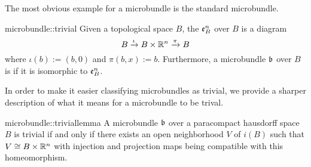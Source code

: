 \begin{myparagraph}
    The most obvious example for a microbundle is the standard microbundle.
\end{myparagraph}

\begin{myexample}{microbundle::trivial}
    Given a topological space $B$, the  $\mathfrak{e}^{n}_B$ over $B$ is a diagram
    \[ B \xrightarrow{\iota} B \times \mathbb{R}^n \xrightarrow{\pi} B{} \]
    where $\iota(b) := (b, 0)$ and $\pi(b, x) := b$.
    Furthermore, a microbundle $\mathfrak{b}$ over $B$ is  if it is isomorphic to $\mathfrak{e}^{n}_B$.
\end{myexample}

\begin{myparagraph}
    In order to make it easier classifying microbundles as trivial,
    we provide a sharper description of what it means for a microbundle to be trival. 
\end{myparagraph}

\begin{mylemma}{microbundle::triviallemma}
    A microbundle $\mathfrak{b}$ over a paracompact hausdorff space $B$ is trivial
    if and only if there exists an open neighborhood $V$ of $i(B)$ such that $V \cong B \times \mathbb{R}^n$
    with injection and projection maps being compatible with this homeomorphism.
\end{mylemma}

